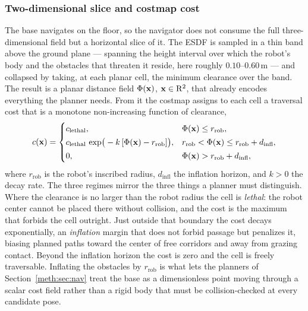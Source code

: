 \subsubsection{Two-dimensional slice and costmap cost}

The base navigates on the floor, so the navigator does not consume the full three-dimensional field but a horizontal slice of it. The ESDF is sampled in a thin band above the ground plane --- spanning the height interval over which the robot's body and the obstacles that threaten it reside, here roughly \ensuremath{0.10\text{--}0.60\,\mathrm{m}} --- and collapsed by taking, at each planar cell, the minimum clearance over the band. The result is a planar distance field $\Phi(\mathbf{x})$, $\mathbf{x}\in\mathrm{R}^2$, that already encodes everything the planner needs. From it the costmap assigns to each cell a traversal cost that is a monotone non-increasing function of clearance,
\begin{equation}
  c(\mathbf{x})=
  \begin{cases}
    c_{\mathrm{lethal}}, & \Phi(\mathbf{x})\le r_{\mathrm{rob}},\\[2pt]
    c_{\mathrm{lethal}}\,\exp\!\big(-k\,[\Phi(\mathbf{x})-r_{\mathrm{rob}}]\big), & r_{\mathrm{rob}}<\Phi(\mathbf{x})\le r_{\mathrm{rob}}+d_{\mathrm{infl}},\\[2pt]
    0, & \Phi(\mathbf{x})>r_{\mathrm{rob}}+d_{\mathrm{infl}},
  \end{cases}
  \label{meth:eq:cost}
\end{equation}
where $r_{\mathrm{rob}}$ is the robot's inscribed radius, $d_{\mathrm{infl}}$ the inflation horizon, and $k>0$ the decay rate. The three regimes mirror the three things a planner must distinguish. Where the clearance is no larger than the robot radius the cell is \emph{lethal}: the robot center cannot be placed there without collision, and the cost is the maximum that forbids the cell outright. Just outside that boundary the cost decays exponentially, an \emph{inflation} margin that does not forbid passage but penalizes it, biasing planned paths toward the center of free corridors and away from grazing contact. Beyond the inflation horizon the cost is zero and the cell is freely traversable. Inflating the obstacles by $r_{\mathrm{rob}}$ is what lets the planners of Section~\ref{meth:sec:nav} treat the base as a dimensionless point moving through a scalar cost field rather than a rigid body that must be collision-checked at every candidate pose.


